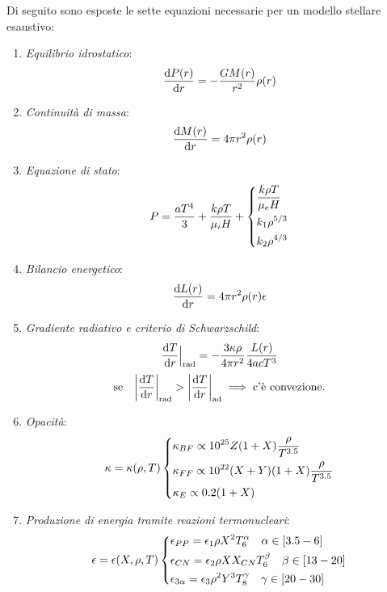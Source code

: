 Di seguito sono esposte le sette equazioni necessarie per un modello stellare esaustivo:
\begin{enumerate}
    \item \emph{Equilibrio idrostatico}:
    \[
    \dfrac{\mathop{\mathrm{{}d}}\mathopen{} P(r)}{\mathop{\mathrm{{}d}}\mathopen{} r} = -\dfrac{G M(r)}{r^2} \rho(r)
    \]
    \item \emph{Continuità di massa}:
    \[
    \dfrac{\mathop{\mathrm{{}d}}\mathopen{} M(r)}{\mathop{\mathrm{{}d}}\mathopen{} r} = 4 \pi r^2 \rho(r)
    \]
    \item \emph{Equazione di stato}:
    \[
    P = \dfrac{aT^4}{3} + \dfrac{k \rho T}{\mu_i H} + 
    \begin{dcases} 
    \frac{k \rho T}{\mu_e H} \\ 
    k_1 \rho^{5/3} \\ 
    k_2 \rho^{4/3}
    \end{dcases}
    \]
    \item \emph{Bilancio energetico}:
    \[
    \dfrac{\mathop{\mathrm{{}d}}\mathopen{} L(r)}{\mathop{\mathrm{{}d}}\mathopen{} r} = 4 \pi r^2 \rho(r) \epsilon
    \]
    \item \emph{Gradiente radiativo e criterio di Schwarzschild}:
    \[
    \dfrac{\mathop{\mathrm{{}d}}\mathopen{} T}{\mathop{\mathrm{{}d}}\mathopen{} r}\Big|_\textup{rad} = - \dfrac{3 \kappa \rho}{4 \pi r^2} \dfrac{L(r)}{4 a c T^3}
    \]
    \[
    \text{se} \quad \abs*{\dfrac{\ud T}{\ud r}}_\textup{rad} > \abs*{\dfrac{\ud T}{\ud r}}_\textup{ad} \implies \text{c'è convezione.}
    \]
    \item \emph{Opacità}:
    \[
    \kappa = \kappa(\rho, T) 
    \begin{dcases} 
    \kappa_{BF} \propto 10^{25} Z(1 + X) \frac{\rho}{T^{3.5}} \\ 
    \kappa_{FF} \propto 10^{22} (X+Y)(1+X) \frac{\rho}{T^{3.5}} \\ 
    \kappa_{E} \propto 0.2 (1+X) \\ 
    \end{dcases}
    \]
    \item \emph{Produzione di energia tramite reazioni termonucleari}:
    \[
    \epsilon = \epsilon(X, \rho, T) 
    \begin{dcases} \epsilon_{PP} = \epsilon_1 \rho X^2 T_6^\alpha \quad \alpha \in [3.5 - 6] \\ 
    \epsilon_{CN} = \epsilon_2 \rho X X_{CN} T_6^\beta \quad \beta \in [13 - 20] \\ 
    \epsilon_{3\alpha} = \epsilon_3 \rho^2 Y^3 T_8^\gamma \quad \gamma \in [20 - 30] \\
    \end{dcases}
    \]
\end{enumerate}